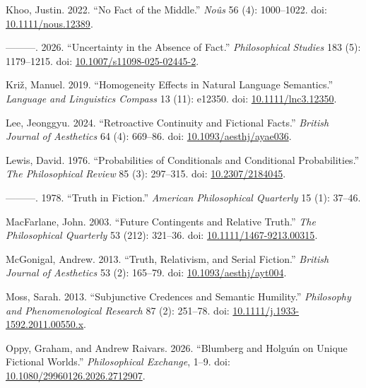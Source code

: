 \documentclass[
  11pt,
  letterpaper,
  DIV=11,
  numbers=noendperiod,
  twoside]{scrartcl}
\newlength{\cslhangindent}
\newenvironment{CSLReferences}[2] %
 {\begin{list}{}{%
  \setlength{\itemindent}{0pt}
  \setlength{\leftmargin}{0pt}
  \setlength{\parsep}{0pt}
  \ifodd #1
   \setlength{\leftmargin}{\cslhangindent}
   \setlength{\itemindent}{-1\cslhangindent}
  \fi
  \setlength{\itemsep}{#2\baselineskip}}}
 {\end{list}}
\begin{document}
\begin{CSLReferences}{1}{0}
Khoo, Justin. 2022. {``No Fact of the Middle.''} \emph{No{û}s} 56 (4):
1000--1022. doi:
\href{https://doi.org/10.1111/nous.12389}{10.1111/nous.12389}.

---------. 2026. {``Uncertainty in the Absence of Fact.''}
\emph{Philosophical Studies} 183 (5): 1179--1215. doi:
\href{https://doi.org/10.1007/s11098-025-02445-2}{10.1007/s11098-025-02445-2}.

Križ, Manuel. 2019. {``Homogeneity Effects in Natural Language
Semantics.''} \emph{Language and Linguistics Compass} 13 (11): e12350.
doi: \href{https://doi.org/10.1111/lnc3.12350}{10.1111/lnc3.12350}.

Lee, Jeonggyu. 2024. {``Retroactive Continuity and Fictional Facts.''}
\emph{British Journal of Aesthetics} 64 (4): 669--86. doi:
\href{https://doi.org/10.1093/aesthj/ayae036}{10.1093/aesthj/ayae036}.

Lewis, David. 1976. {``Probabilities of Conditionals and Conditional
Probabilities.''} \emph{The Philosophical Review} 85 (3): 297--315. doi:
\href{https://doi.org/10.2307/2184045}{10.2307/2184045}.

---------. 1978. {``Truth in Fiction.''} \emph{American Philosophical
Quarterly} 15 (1): 37--46.

MacFarlane, John. 2003. {``Future Contingents and Relative Truth.''}
\emph{The Philosophical Quarterly} 53 (212): 321--36. doi:
\href{https://doi.org/10.1111/1467-9213.00315}{10.1111/1467-9213.00315}.

McGonigal, Andrew. 2013. {``Truth, Relativism, and Serial Fiction.''}
\emph{British Journal of Aesthetics} 53 (2): 165--79. doi:
\href{https://doi.org/10.1093/aesthj/ayt004}{10.1093/aesthj/ayt004}.

Moss, Sarah. 2013. {``Subjunctive Credences and Semantic Humility.''}
\emph{Philosophy and Phenomenological Research} 87 (2): 251--78. doi:
\href{https://doi.org/10.1111/j.1933-1592.2011.00550.x}{10.1111/j.1933-1592.2011.00550.x}.

Oppy, Graham, and Andrew Raivars. 2026. {``Blumberg and Holgu{ı́}n on
Unique Fictional Worlds.''} \emph{Philosophical Exchange}, 1--9. doi:
\href{https://doi.org/10.1080/29960126.2026.2712907}{10.1080/29960126.2026.2712907}.


\end{CSLReferences}
\end{document}
